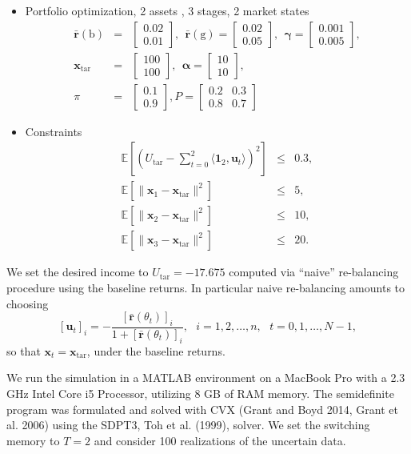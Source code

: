 \documentclass[letterpaper,11pt]{article}
\newcommand{\AR}[2]{\left[\begin{array}{#1}#2\end{array}\right]}
\begin{document}
\begin{itemize}
	\item Portfolio optimization, 2 assets , 3 stages, 2 market states
	\begin{eqnarray*}
		\bar{\mathbf{r}}(\text{b}) & =   &  \AR{c}{ 0.02 \\  0.01 } , ~~
		\bar{\mathbf{r}}(\text{g})  =     \AR{c}{ 0.02 \\  0.05 },  ~~  
		\bm{\gamma} = \AR{c}{ 0.001 \\ 0.005 },\\
		\mathbf{x}_{\text{tar}} & = & \AR{c}{ 100 \\ 100}, ~~ 
		\bm{\alpha} = \AR{c}{ 10 \\ 10}, \\
		\pi & = & \AR{c}{ 0.1 \\ 0.9 },   P  =  \AR{cc}{ 0.2 & 0.3 \\
			0.8 &  0.7}
	\end{eqnarray*}
	\item Constraints 
	\begin{eqnarray*}
		\mathbb{E}[(U_{\text{tar}} -\sum_{t=0}^{2} \langle \mathbf{1}_2, \mathbf{u}_t \rangle)^2  ] 
		& \leq & 0.3, \\
		\mathbb{E}[ \|\mathbf{x}_1-\mathbf{x}_{\text{tar}} \|^2  ] & \leq & 5, \\
		\mathbb{E}[ \|\mathbf{x}_2-\mathbf{x}_{\text{tar}} \|^2  ] & \leq & 10, \\
		\mathbb{E}[ \|\mathbf{x}_3-\mathbf{x}_{\text{tar}} \|^2  ] & \leq & 20.
	\end{eqnarray*}
\end{itemize}
We set the desired income to $ U_{\text{tar}} = -17.675$
computed via ``naive'' re-balancing procedure using the baseline returns.  In particular naive re-balancing  amounts to choosing
$$
[\mathbf{u}_t]_i =     - \frac{[\bar{\mathbf{r}}(\theta_t)]_i}{1 + [\bar{\mathbf{r}}(\theta_t)]_i },  ~~~ i = 1, 2, \hdots, n, ~~~ t= 0,1,  \hdots, N-1,
$$
so that $ \mathbf{x}_t =  \mathbf{x}_{\text{tar}}$, under the baseline 
returns.



We run the simulation in a MATLAB environment on 
a MacBook Pro with a 2.3 GHz Intel Core i5 Processor, utilizing
8 GB of RAM memory. The semidefinite program was formulated 
and solved with CVX  (Grant and Boyd 2014, Grant et al. 2006)
using the SDPT3, Toh et al. (1999), solver. We set the switching memory to $ T = 2 $ and  consider  100 realizations of the uncertain data.
\end{document}
